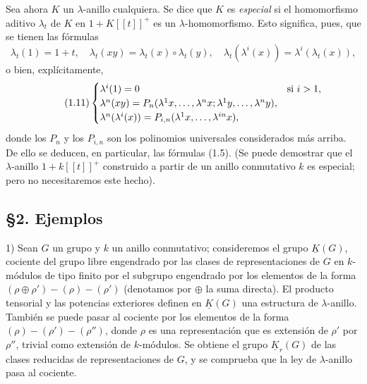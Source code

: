 Sea ahora $K$ un $\lambda$-anillo cualquiera. Se dice que $K$ es \emph{especial} si el homomorfismo aditivo $\lambda_t$ de $K$ en $1+K[[t]]^+$ es un $\lambda$-homomorfismo. Esto significa, pues, que se tienen las fórmulas
\begin{equation}\tag{1.10}
\lambda_t(1)=1+t,\quad
\lambda_t(xy)=\lambda_t(x)\circ\lambda_t(y),\quad
\lambda_t(\lambda^i(x))=\lambda^i(\lambda_t(x)),
\end{equation}
o bien, explícitamente,
\begin{equation}\tag{1.11}
\begin{cases}
\lambda^i(1)=0 & \text{si }i>1,\\
\lambda^n(xy)=P_n(\lambda^1x,\ldots,\lambda^n x;\lambda^1y,\ldots,\lambda^n y),\\
\lambda^n(\lambda^i(x))=P_{i,n}(\lambda^1x,\ldots,\lambda^{\sisi{n}{in}}x),
\end{cases}
\end{equation}
donde los $P_n$ y los $P_{i,n}$ son los polinomios universales considerados más arriba. De ello se deducen, en particular, las fórmulas (1.5). (Se puede demostrar que el $\lambda$-anillo $1+k[[t]]^+$ construido a partir de un anillo conmutativo $k$ es especial; pero no necesitaremos este hecho).

\subsection*{\S 2. Ejemplos}

1) Sean $G$ un grupo y $k$ un anillo conmutativo; consideremos el grupo $\underline{K}(G)$, cociente del grupo libre engendrado por las clases de representaciones de $G$ en $k$-módulos de tipo finito por el subgrupo engendrado por los elementos de la forma $(\rho\oplus\rho')-(\rho)-(\rho')$ (denotamos por $\oplus$ la suma directa). El producto tensorial y las potencias exteriores definen en $\underline{K}(G)$ una estructura de $\lambda$-anillo. También se puede pasar al cociente por los elementos de la forma $(\rho)-(\rho')-(\rho'')$, donde $\rho$ es una representación que es extensión de $\rho'$ por $\rho''$, trivial como extensión de $k$-módulos. Se obtiene el grupo $\underline{K}_r(G)$ de las clases reducidas de representaciones de $G$, y se comprueba que la ley de $\lambda$-anillo pasa al cociente.

